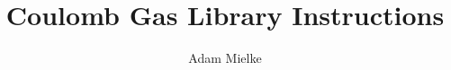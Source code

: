 \documentclass[a4paper,11pt]{article}
\author{Adam Mielke}
\title{Coulomb Gas Library Instructions}
\numberwithin{equation}{section}
\begin{document}
\newcommand{\be}{\begin{eqnarray}}
\newcommand{\ee}{\end{eqnarray}}
\newcommand{\del}{\partial}
\newcommand{\nn}{\nonumber}
\newcommand{\Tr}{{\rm Tr}}
\newcommand{\STr}{{\rm Str}}
\newcommand{\Sdet}{{\rm Sdet}}
\newcommand{\Pf}{{\rm Pf}}
\newcommand{\erf}{{\rm erf}}
\newcommand{\mat}{\left ( \begin{array}{cc}}
	\newcommand{\emat}{\end{array} \right )}
\newcommand{\vect}{\left ( \begin{array}{c}}
	\newcommand{\evect}{\end{array} \right )}
\newcommand{\tr}{{\rm Tr}}
\newcommand{\hm}{\hat m}
\newcommand{\ha}{\hat a}
\newcommand{\hz}{\hat z}
\newcommand{\hze}{\hat \zeta}
\newcommand{\hx}{\hat x}
\newcommand{\hy}{\hat y}
\newcommand{\tm}{\tilde{m}}
\newcommand{\ta}{\tilde{a}}
\newcommand{\U}{\rm U}
\newcommand{\half}{\frac{1}{2}}
\newcommand{\gF}{\gamma_5}
\newcommand{\Lag}{\mathcal{L}}
\newcommand{\BigO}{\mathcal{O}}
\newcommand{\qb}{\bar{q}}
\newcommand{\D}{\slashed{D}}
\newcommand{\hc}{^\dagger}
\newcommand{\inv}{^{-1}}
\newcommand{\diag}{{\rm diag}}
\newcommand{\sign}{{\rm sign}}
\newcommand{\ct}{\tilde{c}}
\newcommand{\eyeFOUR}{\left(\begin{matrix}
		1 & 0 & 0 & 0\\
		0 & 1 & 0 & 0\\
		0 & 0 & 1 & 0\\
		0 & 0 & 0 & 1
	\end{matrix}\right)}
\newcommand{\eyeTWO}{\left(\begin{matrix}
		1 & 0\\
		0 & 1
	\end{matrix}\right)}
\newcommand{\tauONE}{\left(\begin{matrix}
		0 & 1\\
		1 & 0
	\end{matrix}\right)}
\newcommand{\tauTWO}{\left(\begin{matrix}
		0 & -i\\
		i & 0
	\end{matrix}\right)}
\newcommand{\tauTHREE}{\left(\begin{matrix}
		1 & 0\\
		0 & -1
	\end{matrix}\right)}
\newcommand{\OTWO}{\left(\begin{matrix}
		\cos(\phi) & -\sin(\phi)\\
		\sin(\phi) & \cos(\phi)
	\end{matrix}\right)}
\maketitle
\end{document}
